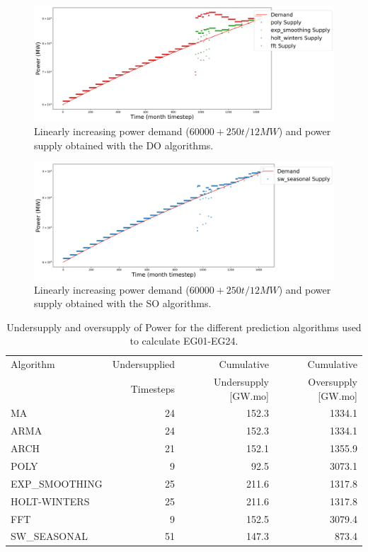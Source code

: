 \documentclass[11pt]{article}
\begin{document}
\begin{figure}[H]
	\centering
	\includegraphics[width=\textwidth]{30-figures/lin-30-power-buffer02.png} 
	\hfill
	\caption{Linearly increasing power demand ($60000 + 250t/12 MW$) and power supply obtained with the DO algorithms.}
	\label{fig:30-lin-DO}
\end{figure}

\begin{figure}[H]
	\centering
	\includegraphics[width=\textwidth]{30-figures/lin-30-power-buffer03.png} 
	\hfill
	\caption{Linearly increasing power demand ($60000 + 250t/12 MW$) and power supply obtained with the SO algorithms.}
	\label{fig:30-lin-SO}
\end{figure}

\begin{table}[H]
	\centering
	\caption{Undersupply and oversupply of Power for the different prediction algorithms used to calculate EG01-EG24.}
	\label{tab:30-lin-power}
	\begin{tabularx}{\textwidth}{lRRR}
		\hline
		Algorithm & Undersupplied & Cumulative  & Cumulative \\
		& Timesteps     & Undersupply [GW.mo]  & Oversupply [GW.mo] \\ \hline
		MA        & 24 & 152.3 & 1334.1 \\ 
		ARMA      & 24 & 152.3 & 1334.1 \\ 
		ARCH      & 21 & 152.1 & 1355.9 \\ 
		POLY      &  9 & 92.5 & 3073.1 \\ 
		EXP\_SMOOTHING 	& 25 & 211.6 & 1317.8 \\ 
		HOLT-WINTERS  	& 25 & 211.6 & 1317.8 \\ 
		FFT       & 9 & 152.5 & 3079.4 \\ 
		SW\_SEASONAL  & 51 & 147.3 & 873.4 \\ \hline
	\end{tabularx}
\end{table}
\end{document}
